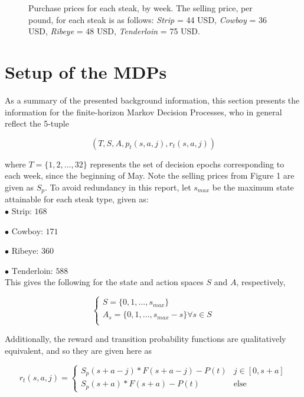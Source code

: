 \documentclass[12pt,a4paper]{article}
\begin{document}
\begin{figure}[H]
\caption{Purchase prices for each steak, by week. The selling price, per pound, for each steak is as follows: \textit{Strip} = 44 USD, \textit{Cowboy} = 36 USD, \textit{Ribeye} = 48 USD, \textit{Tenderloin} = 75 USD.}
\end{figure}

\section{Setup of the MDPs}

As a summary of the presented background information, this section presents the information for the finite-horizon Markov Decision Processes, who in general reflect the 5-tuple

$$(T, S, A, p_{t}(s,a,j), r_{t}(s,a,j)) $$

where $T = \{1,2,...,32\}$ represents the set of decision epochs corresponding to each week, since the beginning of May. Note the selling prices from Figure 1 are given as $S_{p}$. To avoid redundancy in this report, let $s_{max}$ be the maximum state attainable for each steak type, given as:
\\

$ \bullet \text{ Strip: } 168  $

$ \bullet \text{ Cowboy: } 171  $

$ \bullet \text{ Ribeye: } 360  $

$ \bullet \text{ Tenderloin: } 588  $
\\

This gives the following for the state and action spaces $S$ and $A$, respectively,

$$\begin{cases}
S = \{0, 1, ..., s_{max} \} \\
A_{s} = \{0, 1, ..., s_{max} - s \} \forall s \in S \\
\end{cases}$$

Additionally, the reward and transition probability functions are qualitatively equivalent, and so they are given here as

\begin{equation} \label{2}
r_{t}(s,a,j) = \begin{cases} S_{p}(s + a - j) * F(s + a - j) - P(t) & j \in [0,s+a] \\ S_{p}(s + a) * F(s + a) - P(t) & \text{else} \end{cases} 
\end{equation}
\end{document}
